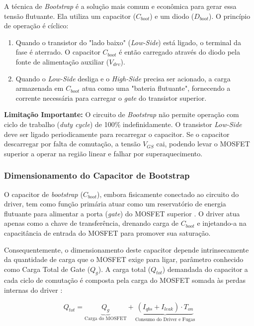 \documentclass[12pt, a4paper, openright, oneside, brazilian]{abntex2}
\begin{document}
A técnica de \textit{Bootstrap} é a solução mais comum e econômica para gerar essa tensão flutuante. Ela utiliza um capacitor ($C_{boot}$) e um diodo ($D_{boot}$). O princípio de operação é cíclico:
\begin{enumerate}
    \item Quando o transistor do "lado baixo" (\textit{Low-Side}) está ligado, o terminal da fase é aterrado. O capacitor $C_{boot}$ é então carregado através do diodo pela fonte de alimentação auxiliar ($V_{drv}$).
    \item Quando o \textit{Low-Side} desliga e o \textit{High-Side} precisa ser acionado, a carga armazenada em $C_{boot}$ atua como uma "bateria flutuante", fornecendo a corrente necessária para carregar o \textit{gate} do transistor superior.
\end{enumerate}

\textbf{Limitação Importante:} O circuito de \textit{Bootstrap} não permite operação com ciclo de trabalho (\textit{duty cycle}) de 100\% indefinidamente. O transistor \textit{Low-Side} deve ser ligado periodicamente para recarregar o capacitor. Se o capacitor descarregar por falta de comutação, a tensão $V_{GS}$ cai, podendo levar o MOSFET superior a operar na região linear e falhar por superaquecimento.

\subsubsection{Dimensionamento do Capacitor de Bootstrap}

O capacitor de \textit{bootstrap} ($C_{boot}$), embora fisicamente conectado ao circuito do driver, tem como função primária atuar como um reservatório de energia flutuante para alimentar a porta (\textit{gate}) do MOSFET superior \cite{infineonAN978}. O driver atua apenas como a chave de transferência, drenando carga de $C_{boot}$ e injetando-a na capacitância de entrada do MOSFET para promover sua saturação.

Consequentemente, o dimensionamento deste capacitor depende intrinsecamente da quantidade de carga que o MOSFET exige para ligar, parâmetro conhecido como Carga Total de Gate ($Q_g$). A carga total ($Q_{tot}$) demandada do capacitor a cada ciclo de comutação é composta pela carga do MOSFET somada às perdas internas do driver \cite{infineonAN978}:

\begin{equation}
    Q_{tot} = \underbrace{Q_g}_{\text{Carga do MOSFET}} + \underbrace{(I_{qbs} + I_{leak}) \cdot T_{on}}_{\text{Consumo do Driver e Fugas}}
\end{equation}
\end{document}
